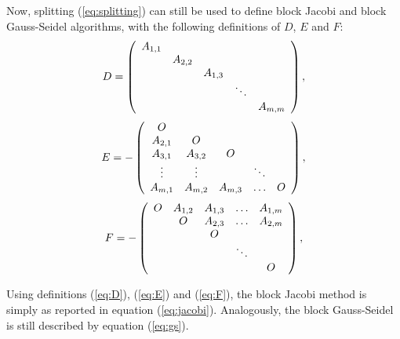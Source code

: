 Now, splitting (\ref{eq:splitting}) can still be used to define block Jacobi
and block Gauss-Seidel algorithms, with the following definitions of $D$, $E$
and $F$:
\begin{equation}
\label{eq:D}
D = 
\left(
\begin{array}{c c c c c}
A_{1,1} &         &         &        &          \\
        & A_{2,2} &         &        &          \\
        &         & A_{1,3} &        &          \\
        &         &         & \ddots &         \\
        &         &         &        & A_{m,m} \\
\end{array}
\right), 
\end{equation}
\begin{equation}
\label{eq:E}
E =  -
\left(
\begin{array}{c c c c c}
 O      &         &         &        &          \\
A_{2,1} & O       &         &        &          \\
A_{3,1} & A_{3,2} & O       &        &          \\
 \vdots & \vdots  &         & \ddots &         \\
A_{m,1} & A_{m,2} & A_{m,3} & \ldots &     O    \\
\end{array}
\right), 
\end{equation}
\begin{equation}
\label{eq:F}
F =  -
\left(
\begin{array}{c c c c c}
 O      & A_{1,2} & A_{1,3} & \ldots & A_{1,m}  \\
        & O       & A_{2,3} & \ldots & A_{2,m}  \\
        &         & O       &        &          \\
        &         &         & \ddots &         \\
        &         &         &        &     O    \\
\end{array}
\right), 
\end{equation}

Using definitions (\ref{eq:D}), (\ref{eq:E}) and (\ref{eq:F}), the block
Jacobi method is simply as reported in equation (\ref{eq:jacobi}). Analogously,
the block Gauss-Seidel is still described by equation (\ref{eq:gs}).

